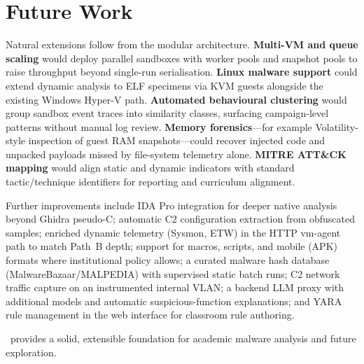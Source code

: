 \section{Future Work}

Natural extensions follow from the modular architecture. \textbf{Multi-VM and queue scaling} would
deploy parallel sandboxes with worker pools and snapshot pools to raise throughput beyond
single-run serialisation. \textbf{Linux malware support} could extend dynamic analysis to ELF
specimens via KVM guests alongside the existing Windows Hyper-V path. \textbf{Automated behavioural
clustering} would group sandbox event traces into similarity classes, surfacing campaign-level
patterns without manual log review. \textbf{Memory forensics}---for example Volatility-style
inspection of guest RAM snapshots---could recover injected code and unpacked payloads missed by
file-system telemetry alone. \textbf{MITRE ATT\&CK mapping} would align static and dynamic
indicators with standard tactic/technique identifiers for reporting and curriculum alignment.

Further improvements include IDA Pro integration for deeper native analysis beyond Ghidra
pseudo-C; automatic C2 configuration extraction from obfuscated samples; enriched dynamic telemetry
(Sysmon, ETW) in the HTTP vm-agent path to match Path~B depth; support for macros, scripts, and
mobile (APK) formats where institutional policy allows; a curated malware hash database
(MalwareBazaar/MALPEDIA) with supervised static batch runs; C2 network traffic capture on an
instrumented internal VLAN; a backend LLM proxy with additional models and automatic
suspicious-function explanations; and YARA rule management in the web interface for classroom rule
authoring.

\rat\ provides a solid, extensible foundation for academic malware analysis and future exploration.
